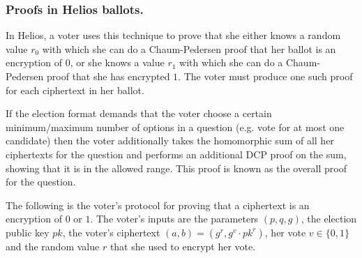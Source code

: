 \documentclass[envcountsame]{llncs}
\newenvironment{helios}{\begin{framed}
\vspace{-18pt}
\begin{figure}
\vspace{-12pt}\quad{\Huge \Sun}
\end{figure}}{\end{framed}}
\begin{document}
\begin{helios}
\subsubsection{Proofs in Helios ballots.}
In Helios, a voter uses this technique to prove that she either knows a random
value $r_0$ with which she can do a Chaum-Pedersen proof that her ballot is an
encryption of $0$, or she knows a value $r_1$ with which she can do a
Chaum-Pedersen proof that she has encrypted $1$. The voter must produce one such
proof for each ciphertext in her ballot.

If the election format demands that the voter choose a certain minimum/maximum
number of options in a question (e.g. vote for at most one candidate) then the
voter additionally takes the homomorphic sum of all her ciphertexts for the
question and performs an additional DCP proof on the sum, showing that it is in
the allowed range. This proof is known as the overall proof for the question.
\end{helios}

\begin{definition}
The following is the voter's protocol for proving that a ciphertext is an
encryption of $0$ or $1$. The voter's inputs are the parameters $(p, q, g)$, the
election public key $pk$, the voter's ciphertext $(a, b) = (g^r, g^v \cdot
pk^r)$, her vote $v \in \{0, 1\}$ and the random value $r$ that she used to
encrypt her vote.
\end{definition}
\end{document}
